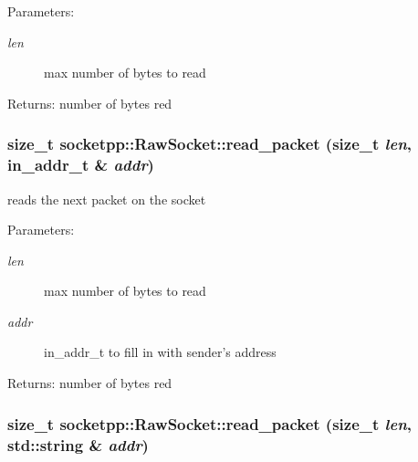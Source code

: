 \begin{Desc}
\item[Parameters:]
\begin{description}
\item[{\em len}]max number of bytes to read \end{description}
\end{Desc}
\begin{Desc}
\item[Returns:]number of bytes red \end{Desc}
\hypertarget{classsocketpp_1_1RawSocket_08b8bec945928764f2d7ee11890b8625}{
\subsubsection[{read\_\-packet}]{\setlength{\rightskip}{0pt plus 5cm}size\_\-t socketpp::RawSocket::read\_\-packet (size\_\-t {\em len}, \/  in\_\-addr\_\-t \& {\em addr})}}
\label{classsocketpp_1_1RawSocket_08b8bec945928764f2d7ee11890b8625}


reads the next packet on the socket 

\begin{Desc}
\item[Parameters:]
\begin{description}
\item[{\em len}]max number of bytes to read \item[{\em addr}]in\_\-addr\_\-t to fill in with sender's address \end{description}
\end{Desc}
\begin{Desc}
\item[Returns:]number of bytes red \end{Desc}
\hypertarget{classsocketpp_1_1RawSocket_1564181b6422fb3918c419051b34ae2d}{
\subsubsection[{read\_\-packet}]{\setlength{\rightskip}{0pt plus 5cm}size\_\-t socketpp::RawSocket::read\_\-packet (size\_\-t {\em len}, \/  std::string \& {\em addr})}}
\label{classsocketpp_1_1RawSocket_1564181b6422fb3918c419051b34ae2d}


